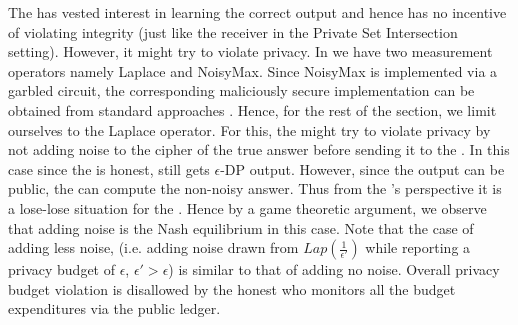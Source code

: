 The \AS has vested interest in learning the correct output and hence has no incentive of violating integrity (just like the receiver in the Private Set Intersection setting).
 However, it might try to violate privacy. In \system we have two measurement operators namely \textsf{Laplace} and \textsf{NoisyMax}. Since \textsf{NoisyMax} is implemented via a garbled circuit, the corresponding maliciously secure implementation can be obtained from standard approaches \cite{Wang:2017:AGE:3133956.3134053}. Hence, for the rest of the section, we limit ourselves to the \textsf{Laplace} operator. For this, the \AS might try to violate privacy by not adding noise to the cipher of the true answer before sending it to the \CSP. In this case since the \CSP is honest, \AS still gets $\epsilon$-DP output.
However, since the output can be public, the \CSP can compute the non-noisy answer.
Thus from the \AS's perspective it is  a lose-lose situation for the \AS. Hence by a game theoretic argument, we observe that adding noise is the Nash equilibrium %
in this case.
Note that the case of adding less noise, (i.e. adding noise drawn from $Lap(\frac{1}{\epsilon'})$ while reporting a privacy budget of $\epsilon$, $\epsilon' > \epsilon$) is  similar to that of adding no noise.
Overall privacy budget violation is disallowed by the honest \CSP who monitors all the budget expenditures via the public ledger.

